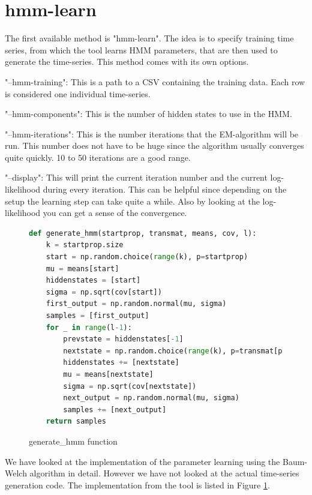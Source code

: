 \section{hmm-learn}

The first available method is "hmm-learn". The idea is to specify training time series, from which the tool learns HMM parameters, that are then used to generate the time-series. This method comes with its own options. 

"--hmm-training": This is a path to a CSV containing the training data. Each row is considered one individual time-series. 

"--hmm-components": This is the number of hidden states to use in the HMM. 

"--hmm-iterations": This is the number iterations that the EM-algorithm will be run. This number does not have to be huge since the algorithm usually converges quite quickly. 10 to 50 iterations are a good range. 

"--display": This will print the current iteration number and the current log-likelihood during every iteration. This can be helpful since depending on the setup the learning step can take quite a while. Also by looking at the log-likelihood you can get a sense of the convergence. 

\begin{figure}
\begin{singlespace}
\begin{lstlisting}[language=Python]
def generate_hmm(startprop, transmat, means, cov, l):
    k = startprop.size
    start = np.random.choice(range(k), p=startprop)
    mu = means[start]
    hiddenstates = [start]
    sigma = np.sqrt(cov[start])
    first_output = np.random.normal(mu, sigma)
    samples = [first_output]
    for _ in range(l-1):
        prevstate = hiddenstates[-1]
        nextstate = np.random.choice(range(k), p=transmat[prevstate])
        hiddenstates += [nextstate]
        mu = means[nextstate]
        sigma = np.sqrt(cov[nextstate])
        next_output = np.random.normal(mu, sigma)
        samples += [next_output]
    return samples
\end{lstlisting}
\end{singlespace}
\caption{generate\_hmm function}    
\label{fig:hmm-generate}
\end{figure}

We have looked at the implementation of the parameter learning using the Baum-Welch algorithm in detail. However we have not looked at the actual time-series generation code. The implementation from the tool is listed in Figure \ref{fig:hmm-generate}. 

